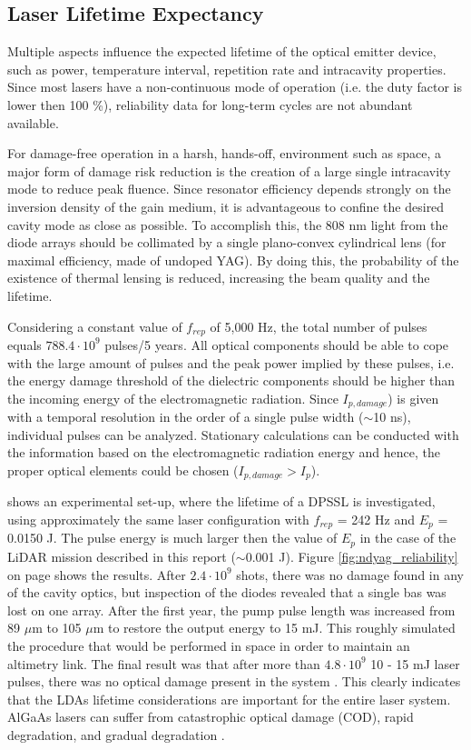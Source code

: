 \subsection{ Laser Lifetime Expectancy} 
\label{opticallifetime}
Multiple aspects influence the expected lifetime of the optical emitter device, such as power, temperature interval, repetition rate and intracavity properties. Since most \acp{laser} have a non-continuous mode of operation (i.e. the duty factor is lower then 100 \%), reliability data for long-term cycles are not abundant available.  

For damage-free operation in a harsh, hands-off, environment such as space, a major form of damage risk reduction is the creation of a large single intracavity mode to reduce peak fluence. Since resonator efficiency depends strongly on the inversion density of the gain medium, it is advantageous to confine the desired cavity mode as close as possible. To accomplish this, the 808 nm light from the diode arrays should be collimated by a single plano-convex cylindrical lens (for maximal efficiency, made of undoped YAG). By doing this, the probability of the existence of thermal lensing is reduced, increasing the beam quality and the lifetime. 

Considering a constant value of $f_{rep}$ of 5,000 Hz, the total number of pulses equals $788.4\cdot10^{9}$ pulses/5 years. All optical components should be able to cope with the large amount of pulses and the peak power implied by these pulses, i.e. the energy damage threshold of the dielectric components should be higher than the incoming energy of the electromagnetic radiation. Since $I_{p,damage}$) is given with a temporal resolution in the order of a single pulse width ($\sim$10 ns), individual pulses can be analyzed. Stationary calculations can be conducted with the information based on the electromagnetic radiation energy and hence, the proper optical elements could be chosen ($I_{p,damage} > I_{p}$).

\cite{nd_yag_life} shows an experimental set-up, where the lifetime of a \acs{DPSSL} is investigated, using approximately the same \acs{laser} configuration with $f_{rep}$ = 242 Hz and $E_{p}$ = 0.0150 J. The pulse energy is much larger then the value of $E_{p}$ in the case of the \acs{LiDAR} mission described in this report ($\sim$0.001 J). Figure \ref{fig:ndyag_reliability} on page \pageref{fig:ndyag_reliability} shows the results. After $2.4\cdot10^{9}$ shots, there was no damage found in any of the cavity optics, but inspection of the diodes revealed that a single bas was lost on one array. After the first year, the pump pulse length was increased from 89 $\mu$m to 105 $\mu$m to restore the output energy to 15 mJ. This roughly simulated the procedure that would be performed in space in order to maintain an altimetry link. The final result was that after more than $4.8\cdot10^{9}$ 10 - 15 mJ laser pulses, there was no optical damage present in the system \cite{nd_yag_life}. This clearly indicates that the \acp{LDA} lifetime considerations are important for the entire \acs{laser} system. AlGaAs lasers can suffer from catastrophic optical damage (COD), rapid degradation, and gradual degradation \cite{algaas}.


